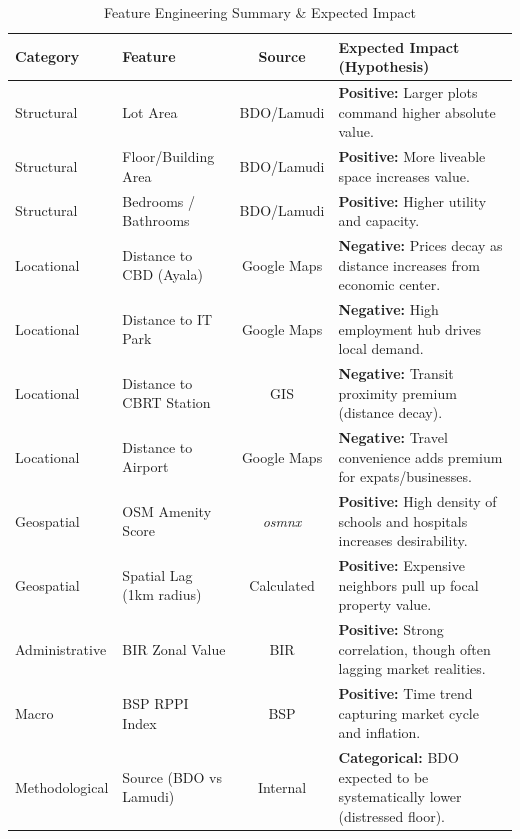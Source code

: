 \begin{table}[h]
\centering
\caption{Feature Engineering Summary \& Expected Impact}
\label{tab:feature_engineering}
\begin{tabular}{llcp{6cm}}
\toprule
\textbf{Category} & \textbf{Feature} & \textbf{Source} & \textbf{Expected Impact (Hypothesis)} \\
\midrule
Structural & Lot Area & BDO/Lamudi & \textbf{Positive:} Larger plots command higher absolute value. \\
Structural & Floor/Building Area & BDO/Lamudi & \textbf{Positive:} More liveable space increases value. \\
Structural & Bedrooms / Bathrooms & BDO/Lamudi & \textbf{Positive:} Higher utility and capacity. \\
\midrule
Locational & Distance to CBD (Ayala) & Google Maps & \textbf{Negative:} Prices decay as distance increases from economic center. \\
Locational & Distance to IT Park & Google Maps & \textbf{Negative:} High employment hub drives local demand. \\
Locational & Distance to CBRT Station & GIS & \textbf{Negative:} Transit proximity premium (distance decay). \\
Locational & Distance to Airport & Google Maps & \textbf{Negative:} Travel convenience adds premium for expats/businesses. \\
\midrule
Geospatial & OSM Amenity Score & \textit{osmnx} & \textbf{Positive:} High density of schools and hospitals increases desirability. \\
Geospatial & Spatial Lag (1km radius) & Calculated & \textbf{Positive:} Expensive neighbors pull up focal property value. \\
\midrule
Administrative & BIR Zonal Value & BIR & \textbf{Positive:} Strong correlation, though often lagging market realities. \\
Macro & BSP RPPI Index & BSP & \textbf{Positive:} Time trend capturing market cycle and inflation. \\
Methodological & Source (BDO vs Lamudi) & Internal & \textbf{Categorical:} BDO expected to be systematically lower (distressed floor). \\
\bottomrule
\end{tabular}
\end{table}
